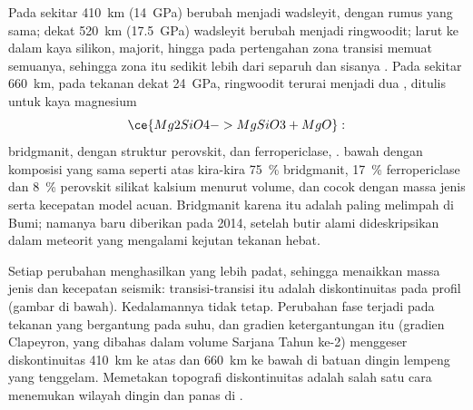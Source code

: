 Pada sekitar \qty{410}{km} (\qty{14}{GPa})   berubah menjadi wadsleyit, dengan rumus yang sama; dekat \qty{520}{km} (\qty{17.5}{GPa}) wadsleyit berubah menjadi ringwoodit;  larut ke dalam  kaya silikon, majorit, hingga pada pertengahan zona transisi  memuat semuanya, sehingga zona itu sedikit lebih dari separuh   dan sisanya . Pada sekitar \qty{660}{km}, pada tekanan dekat \qty{24}{GPa}, ringwoodit terurai menjadi dua , ditulis untuk  kaya magnesium
\[
  \ce{Mg2SiO4 -> MgSiO3 + MgO}:
\]
bridgmanit,  dengan struktur perovskit, dan ferropericlase, .  bawah dengan komposisi yang sama seperti  atas kira-kira \qty{75}{\percent} bridgmanit, \qty{17}{\percent} ferropericlase dan \qty{8}{\percent} perovskit silikat kalsium menurut volume, dan cocok dengan massa jenis serta kecepatan model acuan. Bridgmanit karena itu adalah  paling melimpah di Bumi; namanya baru diberikan pada 2014, setelah butir alami dideskripsikan dalam meteorit yang mengalami kejutan tekanan hebat.

Setiap perubahan menghasilkan  yang lebih padat, sehingga menaikkan massa jenis dan kecepatan seismik: transisi-transisi itu adalah diskontinuitas pada profil (gambar di bawah). Kedalamannya tidak tetap. Perubahan fase terjadi pada tekanan yang bergantung pada suhu, dan gradien ketergantungan itu (gradien Clapeyron, yang dibahas dalam volume Sarjana Tahun ke-2) menggeser diskontinuitas \qty{410}{km} ke atas dan \qty{660}{km} ke bawah di batuan dingin lempeng yang tenggelam. Memetakan topografi diskontinuitas adalah salah satu cara menemukan wilayah dingin dan panas di .

